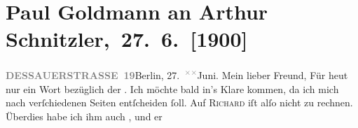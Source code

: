 

         
         \renewcommand{\erwaehntePersonen}{Personen: Richard Beer-Hofmann, Paul Goldmann, Robert Hirschfeld, Leo Van-Jung}
         \renewcommand{\erwaehnteInstitutionen}{Institutionen: Houghton Library}
         \renewcommand{\erwaehnteOrte}{Orte: Alpen, Altaussee, Berlin, Dessauer Straße, Salzburg, Sekirn, Südtirol}
         \renewcommand{\erwaehnteWerke}{Werke: Tagebuch}
               \section[ Paul Goldmann an Arthur Schnitzler, 27. 6. {[}1900{]}]{ Paul Goldmann an Arthur Schnitzler, 27. 6. {[}1900{]}}\nopagebreak{}\rehead{ }\begin{ledgroupsized}[t]{13cm}\normalsize\beginnumbering \toendnotes[C]{\smallbreak\pagebreak[2]} 
\toendnotes[C]{\smallbreak}\pstart
           \noindent{}{\pb}\textcolor{gray}{\textbf{DESSAUERSTRASSE 19}}\hfill Berlin, 27. \substVorne{}\textsuperscript{\textcolor{gray}{×}\-\textcolor{gray}{×}}\substDazwischen{}Ju\substHinten{}ni.\pend
           \pstart\center{}Mein lieber Freund,\pend\pstart
           Für heut nur ein Wort bezüglich der \label{K_L02922-1v}\label{K_L02922-1h}. Ich möchte bald in’s Klare kommen, da ich mich nach verſchiedenen Seiten
               entſcheiden ſoll. Auf \textsc{Richard} iſt alſo nicht zu rechnen. Überdies habe ich \strikeout{\textcolor{gray}{dir}} ihm auch \label{K_L02922-2v}\label{K_L02922-2h}, und er

\end{ledgroupsized}
